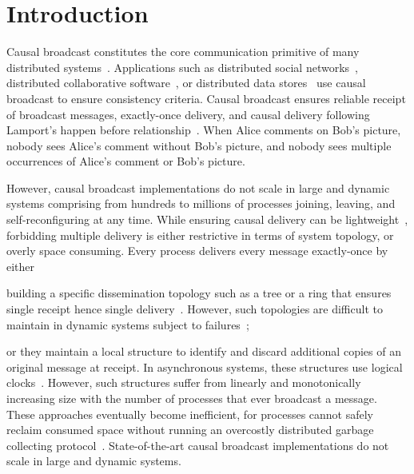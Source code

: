  
\section{Introduction}


Causal broadcast constitutes the core communication primitive of many
distributed systems~\cite{hadzilacos1994modular}. Applications such as
distributed social networks~\cite{borthakur2013petabyte}, distributed
collaborative software~\cite{heinrich2012exploiting,nedelec2016crate}, or
distributed data
stores~\cite{bailis2013bolton,bravo2017saturn,demers1987epidemic,lloyd2011cops,shapiro2011comprehensive}
use causal broadcast to ensure consistency criteria.  Causal broadcast ensures
reliable receipt of broadcast messages, exactly-once delivery, and causal
delivery following Lamport's happen before
relationship~\cite{lamport1978time}. When Alice comments on Bob's picture,
nobody sees Alice's comment without Bob's picture, and nobody sees multiple
occurrences of Alice's comment or Bob's picture.

However, causal broadcast implementations do not scale in large and dynamic
systems comprising from hundreds to millions of processes joining, leaving, and
self-reconfiguring at any time. While ensuring causal delivery can be
lightweight~\cite{nedelec2018pcbroadcast}, forbidding multiple delivery is
either restrictive in terms of system topology, or overly space consuming. Every
process delivers every message exactly-once by either
\begin{inparaenum}[(i)]
\item building a specific dissemination topology such as a tree or a ring that
  ensures single receipt hence single
  delivery~\cite{bravo2017saturn,raynal2013distributed}. However, such
  topologies are difficult to maintain in dynamic systems subject to
  failures~\cite{krasikova2016hashtable};
\item or they maintain a local structure to identify and discard additional
  copies of an original message at receipt. In asynchronous systems, these
  structures use logical clocks~\cite{malkhi2007concise,mukund2014optimized}.
  However, such structures suffer from linearly and monotonically increasing
  size with the number of processes that ever broadcast a message.  These
  approaches eventually become inefficient, for processes cannot safely reclaim
  consumed space without running an overcostly distributed garbage collecting
  protocol~\cite{abdullahi1998garbage}. State-of-the-art causal broadcast
  implementations do not scale in large and dynamic systems.
\end{inparaenum}

